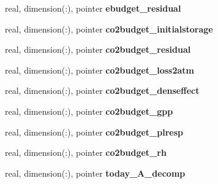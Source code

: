 \begin{DoxyCompactItemize}
\item 
\hypertarget{structed__state__vars_1_1sitetype_a597e1bbfaf22e8ebe00c73a284fd61c3}{
real, dimension(:), pointer {\bfseries ebudget\_\-residual}}
\label{structed__state__vars_1_1sitetype_a597e1bbfaf22e8ebe00c73a284fd61c3}

\item 
\hypertarget{structed__state__vars_1_1sitetype_a51e853460f370bae118ff7ccac1d07bf}{
real, dimension(:), pointer {\bfseries co2budget\_\-initialstorage}}
\label{structed__state__vars_1_1sitetype_a51e853460f370bae118ff7ccac1d07bf}

\item 
\hypertarget{structed__state__vars_1_1sitetype_ae27a7869e112deb9ddd100a995cb6a0e}{
real, dimension(:), pointer {\bfseries co2budget\_\-residual}}
\label{structed__state__vars_1_1sitetype_ae27a7869e112deb9ddd100a995cb6a0e}

\item 
\hypertarget{structed__state__vars_1_1sitetype_a73380f2b1227e230e0f170607bfd20c8}{
real, dimension(:), pointer {\bfseries co2budget\_\-loss2atm}}
\label{structed__state__vars_1_1sitetype_a73380f2b1227e230e0f170607bfd20c8}

\item 
\hypertarget{structed__state__vars_1_1sitetype_a9c75b8e5986de36772c9600cfabc7d62}{
real, dimension(:), pointer {\bfseries co2budget\_\-denseffect}}
\label{structed__state__vars_1_1sitetype_a9c75b8e5986de36772c9600cfabc7d62}

\item 
\hypertarget{structed__state__vars_1_1sitetype_a08e81c2b099955b3259659be36ee0dfc}{
real, dimension(:), pointer {\bfseries co2budget\_\-gpp}}
\label{structed__state__vars_1_1sitetype_a08e81c2b099955b3259659be36ee0dfc}

\item 
\hypertarget{structed__state__vars_1_1sitetype_a02230b3cd4d3a1284ffe545c4af9c5d6}{
real, dimension(:), pointer {\bfseries co2budget\_\-plresp}}
\label{structed__state__vars_1_1sitetype_a02230b3cd4d3a1284ffe545c4af9c5d6}

\item 
\hypertarget{structed__state__vars_1_1sitetype_a25dff9f18e3295c6d806ba7c0c6f0fad}{
real, dimension(:), pointer {\bfseries co2budget\_\-rh}}
\label{structed__state__vars_1_1sitetype_a25dff9f18e3295c6d806ba7c0c6f0fad}

\item 
\hypertarget{structed__state__vars_1_1sitetype_a3893e43fd4c55fcb61c9b9532ae144f7}{
real, dimension(:), pointer {\bfseries today\_\-A\_\-decomp}}
\label{structed__state__vars_1_1sitetype_a3893e43fd4c55fcb61c9b9532ae144f7}


\end{DoxyCompactItemize}
